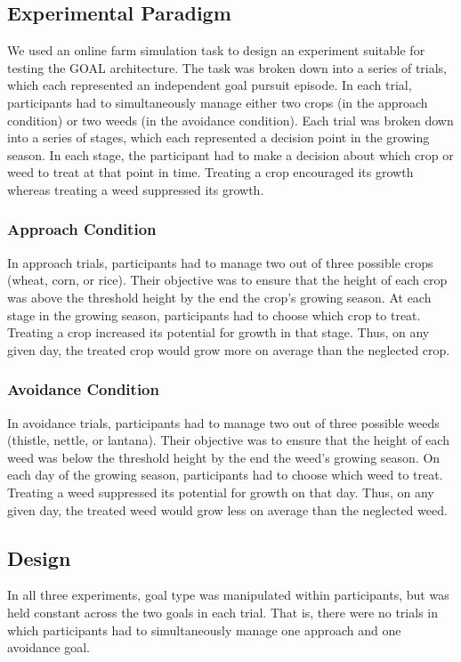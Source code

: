 \documentclass[a4paper,doc,natbib,donotrepeattitle]{apa6}
\begin{document}
\subsection{Experimental Paradigm}
	We used an online farm simulation task to design an experiment suitable for testing the GOAL architecture. The task was broken down into a series of trials, which each represented an independent goal pursuit episode. In each trial, participants had to simultaneously manage either two crops (in the approach condition) or two weeds (in the avoidance condition). Each trial was broken down into a series of stages, which each represented a decision point in the growing season. In each stage, the participant had to make a decision about which crop or weed to treat at that point in time. Treating a crop encouraged its growth whereas treating a weed suppressed its growth.

\subsubsection{Approach Condition}In approach trials, participants had to manage two out of three possible crops (wheat, corn, or rice). Their objective was to ensure that the height of each crop was above the threshold height by the end the crop's growing season. At each stage in the growing season, participants had to choose which crop to treat. Treating a crop increased its potential for growth in that stage. Thus, on any given day, the treated crop would grow more on average than the neglected crop.

\subsubsection{Avoidance Condition}In avoidance trials, participants had to manage two out of three possible weeds (thistle, nettle, or lantana). Their objective was to ensure that the height of each weed was below the threshold height by the end the weed's growing season. On each day of the growing season, participants had to choose which weed to treat. Treating a weed suppressed its potential for growth on that day. Thus, on any given day, the treated weed would grow less on average than the neglected weed.

\subsection{Design}

In all three experiments, goal type was manipulated within participants, but was held constant across the two goals in each trial. That is, there were no trials in which participants had to simultaneously manage one approach and one avoidance goal.
\end{document}
